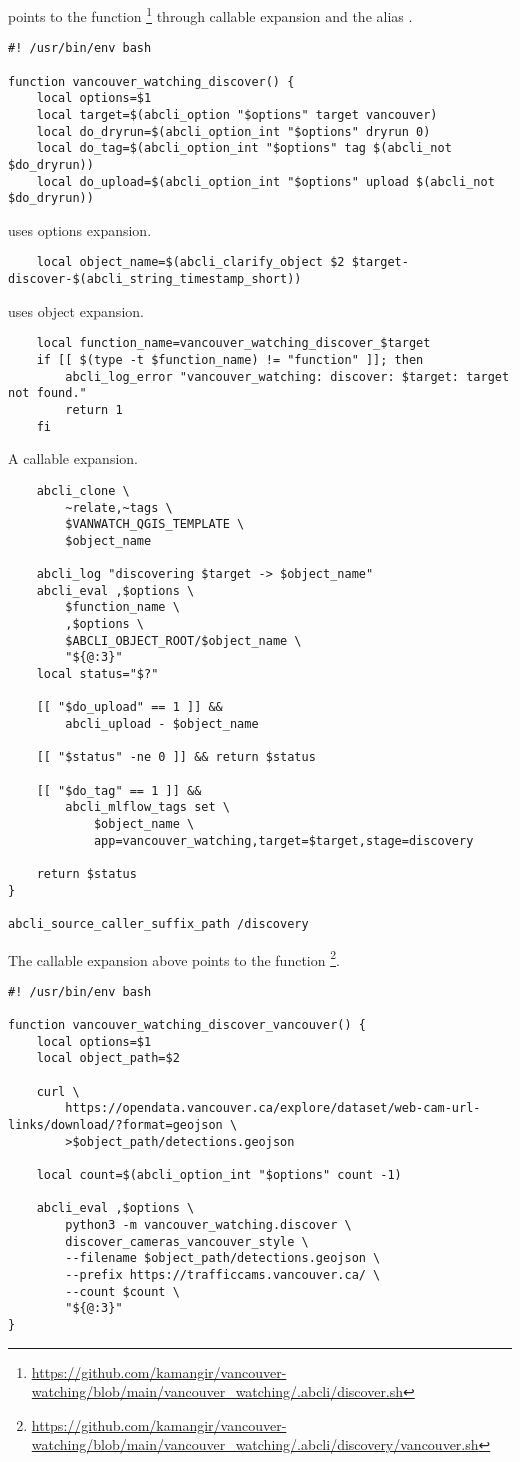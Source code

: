  points to the function \footnote{\url{https://github.com/kamangir/vancouver-watching/blob/main/vancouver_watching/.abcli/discover.sh}} through callable expansion and the alias .
%
\begin{verbatim}
#! /usr/bin/env bash

function vancouver_watching_discover() {
	local options=$1
	local target=$(abcli_option "$options" target vancouver)
	local do_dryrun=$(abcli_option_int "$options" dryrun 0)
	local do_tag=$(abcli_option_int "$options" tag $(abcli_not $do_dryrun))
	local do_upload=$(abcli_option_int "$options" upload $(abcli_not $do_dryrun))
\end{verbatim}
%
 uses options expansion.
%
\begin{verbatim}
	local object_name=$(abcli_clarify_object $2 $target-discover-$(abcli_string_timestamp_short))
\end{verbatim}
%
 uses object expansion.
%
\begin{verbatim}
	local function_name=vancouver_watching_discover_$target
	if [[ $(type -t $function_name) != "function" ]]; then
		abcli_log_error "vancouver_watching: discover: $target: target not found."
		return 1
	fi
\end{verbatim}
%
A callable expansion.
%
\begin{verbatim}
	abcli_clone \
		~relate,~tags \
		$VANWATCH_QGIS_TEMPLATE \
		$object_name

	abcli_log "discovering $target -> $object_name"
	abcli_eval ,$options \
		$function_name \
		,$options \
		$ABCLI_OBJECT_ROOT/$object_name \
		"${@:3}"
	local status="$?"

	[[ "$do_upload" == 1 ]] &&
		abcli_upload - $object_name

	[[ "$status" -ne 0 ]] && return $status

	[[ "$do_tag" == 1 ]] &&
		abcli_mlflow_tags set \
			$object_name \
			app=vancouver_watching,target=$target,stage=discovery

	return $status
}

abcli_source_caller_suffix_path /discovery
\end{verbatim}
%
The callable expansion above points to the function \footnote{\url{https://github.com/kamangir/vancouver-watching/blob/main/vancouver_watching/.abcli/discovery/vancouver.sh}}.
%
\begin{verbatim}
#! /usr/bin/env bash

function vancouver_watching_discover_vancouver() {
	local options=$1
	local object_path=$2

	curl \
		https://opendata.vancouver.ca/explore/dataset/web-cam-url-links/download/?format=geojson \
		>$object_path/detections.geojson

	local count=$(abcli_option_int "$options" count -1)

	abcli_eval ,$options \
		python3 -m vancouver_watching.discover \
		discover_cameras_vancouver_style \
		--filename $object_path/detections.geojson \
		--prefix https://trafficcams.vancouver.ca/ \
		--count $count \
		"${@:3}"
}
\end{verbatim}

